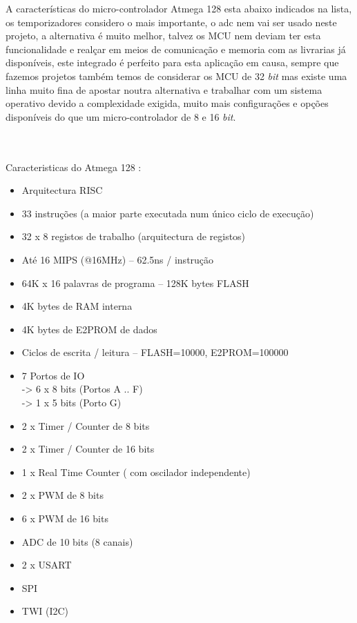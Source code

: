\newpage
A características do micro-controlador Atmega 128 esta abaixo indicados na lista, os temporizadores considero o mais importante, o \ac{adc} nem vai ser usado neste projeto, a alternativa é muito melhor, talvez os MCU nem deviam ter esta funcionalidade e realçar em meios de comunicação e memoria com as livrarias já disponíveis, este integrado é perfeito para esta aplicação em causa, sempre que fazemos projetos também temos de considerar os MCU de 32 \textit{bit} mas existe uma linha muito fina de apostar noutra alternativa e trabalhar com um sistema operativo devido a complexidade exigida, muito mais configurações e opções disponíveis do que um micro-controlador de 8 e 16 \textit{bit}.
\\
\\
\\
\begin{minipage}{\linewidth}
{\Large Caracteristicas do Atmega 128 :}
\begin{itemize}	
	\setlength\itemsep{-0.3em}
	\item Arquitectura RISC
	\item 33 instruções (a maior parte executada num único ciclo de execução)
	\item 32 x 8 registos de trabalho (arquitectura de registos)
	\item Até 16 MIPS (@16MHz) – 62.5ns / instrução
	\item 64K x 16 palavras de programa – 128K bytes FLASH
	\item 4K bytes de RAM interna
	\item 4K bytes de E2PROM de dados
	\item Ciclos de escrita / leitura – FLASH=10000, E2PROM=100000
	\item 7 Portos de IO \\
		\hspace*{.5cm}	-> 6 x 8 bits (Portos A .. F) \\
		\hspace*{.5cm}	-> 1 x 5 bits (Porto G)
	\item 2 x Timer / Counter de 8 bits
	\item 2 x Timer / Counter de 16 bits
	\item 1 x Real Time Counter ( com oscilador independente)
	\item 2 x PWM de 8 bits
	\item 6 x PWM de 16 bits
	\item ADC de 10 bits (8 canais)
	\item 2 x USART
	\item SPI
	\item TWI (I2C)
\end{itemize}
\end{minipage}

